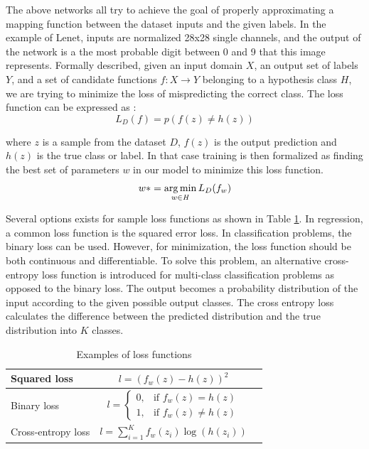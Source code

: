 The above networks all try to achieve the goal of properly approximating a mapping function between the dataset inputs and the given labels. In the example of Lenet, inputs are normalized 28x28 single channels, and the output of the network is a the most probable digit between 0 and 9 that this image represents. Formally described, given an input domain $\mathit{X}$, an output set of labels $\mathit{Y}$, and a set of candidate functions $\mathit{f : X \rightarrow Y}$ belonging to a hypothesis class $\mathit{H}$, we are trying to minimize the loss of mispredicting the correct class. The loss function can be expressed as :
\begin{equation}
L_D(f) = p( f(z) \neq h(z)) 
\end{equation} 
 
 where $\mathit{z}$ is a sample from the dataset $\mathit{D}$,  $\mathit{f(z)}$ is the output prediction and $\mathit{h(z)}$ is the true class or label. In that case training is then formalized as finding the best set of parameters $\mathit{w}$ in our model to minimize this loss function. 
\begin{equation}
 w* = \operatorname*{arg\,min}\limits_{ w \in \mathit{H} } L_D(f_w)
 \end{equation}

Several options exists for sample loss functions as shown in Table \ref{tab:loss}. In regression, a common loss function is the squared error loss. In classification problems, the binary loss can be used. However, for minimization, the loss function should be both continuous and differentiable. To solve this problem, an alternative cross-entropy loss function is introduced for multi-class classification problems as opposed to the binary loss. The output becomes a probability distribution of the input according to the given possible output classes. The cross entropy loss calculates the difference between the predicted distribution and the true distribution into $\mathit{K}$ classes.

\begin{table}[h!]
	\centering
	\begin{tabular}{| l | c | r |}
		 \hline
	Squared loss 	& $l=(f_{w}(z)-h(z))^{2}$  \\ \hline
	Binary loss 	&  $l=\left\{\begin{array}{cl} 0, & \mbox{if }f_{w}(z)=h(z)\\ 1, & \mbox{if }f_{w}(z) \neq h(z) \end{array}\right.  $ \\ \hline
	Cross-entropy loss 	& $l=\sum_{i=1}^{K}f_{w}(z_{i})\log(h(z_{i}))$  \\
	 \hline
	\end{tabular}
\caption[Loss Functions]{Examples of loss functions}
\label{tab:loss}
\end{table}

